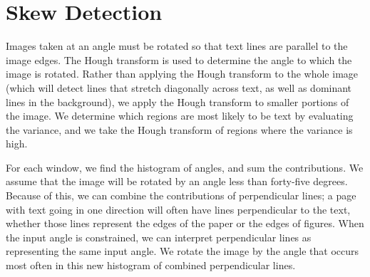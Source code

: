 \documentclass{report}
\begin{document}
\section{Skew Detection}
Images taken at an angle must be rotated so that text lines are parallel to the image edges. The Hough transform is used to determine the angle to which the image is rotated. Rather than applying the Hough transform to the whole image (which will detect lines that stretch diagonally across text, as well as dominant lines in the background), we apply the Hough transform to smaller portions of the image. We determine which regions are most likely to be text by evaluating the variance, and we take the Hough transform of regions where the variance is high.  


For each window, we find the histogram of angles, and sum the contributions. We assume that the image will be rotated by an angle less than forty-five degrees. Because of this, we can combine the contributions of perpendicular lines; a page with text going in one direction will often have lines perpendicular to the text, whether those lines represent the edges of the paper or the edges of figures. When the input angle is constrained, we can interpret perpendicular lines as representing the same input angle. We rotate the image by the angle that occurs most often in this new histogram of combined perpendicular lines.
\end{document}
